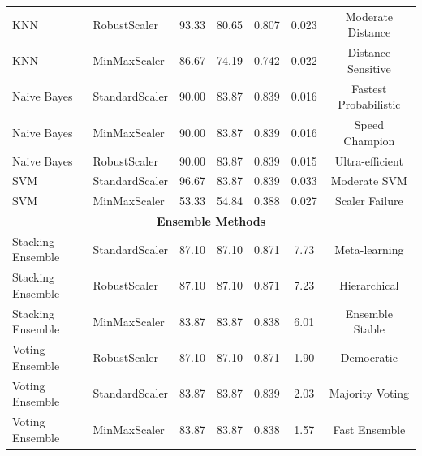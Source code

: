 \begin{table}[H]
{\begin{tabular}{|l|l|c|c|c|c|c|}
KNN & RobustScaler & 93.33 & 80.65 & 0.807 & 0.023 & Moderate Distance \\
KNN & MinMaxScaler & 86.67 & 74.19 & 0.742 & 0.022 & Distance Sensitive \\
Naive Bayes & StandardScaler & 90.00 & 83.87 & 0.839 & 0.016 & Fastest Probabilistic \\
Naive Bayes & MinMaxScaler & 90.00 & 83.87 & 0.839 & 0.016 & Speed Champion \\
Naive Bayes & RobustScaler & 90.00 & 83.87 & 0.839 & 0.015 & Ultra-efficient \\
SVM & StandardScaler & 96.67 & 83.87 & 0.839 & 0.033 & Moderate SVM \\
SVM & MinMaxScaler & 53.33 & 54.84 & 0.388 & 0.027 & Scaler Failure \\
\hline
\multicolumn{7}{|c|}{\textbf{Ensemble Methods}} \\
\hline
Stacking Ensemble & StandardScaler & 87.10 & 87.10 & 0.871 & 7.73 & Meta-learning \\
Stacking Ensemble & RobustScaler & 87.10 & 87.10 & 0.871 & 7.23 & Hierarchical \\
Stacking Ensemble & MinMaxScaler & 83.87 & 83.87 & 0.838 & 6.01 & Ensemble Stable \\
Voting Ensemble & RobustScaler & 87.10 & 87.10 & 0.871 & 1.90 & Democratic \\
Voting Ensemble & StandardScaler & 83.87 & 83.87 & 0.839 & 2.03 & Majority Voting \\
Voting Ensemble & MinMaxScaler & 83.87 & 83.87 & 0.838 & 1.57 & Fast Ensemble \\
\hline
\end{tabular}%
}
\end{table}

